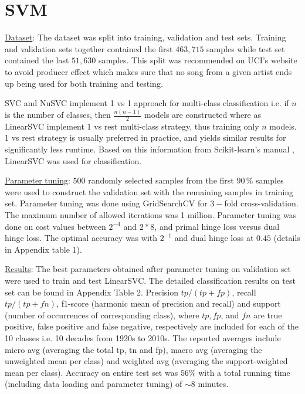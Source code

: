 \documentclass{article}
\begin{document}
\section*{SVM}
\underline{Dataset}: The dataset was split into training, validation and test sets. Training and validation sets together contained the first $463,715$ samples while test set contained the last $51,630$ samples. This split was recommended on UCI's website to avoid producer effect which makes sure that no song from a given artist ends up being used for both training and testing. 

\noindent SVC and NuSVC implement 1 vs 1 approach for multi-class classification i.e. if $n$ is the number of classes, then $\frac{n(n-1)}{2}$ models are constructed where as LinearSVC implement 1 vs rest multi-class strategy, thus training only $n$ models. 1 vs rest strategy is usually preferred in practice, and yields similar results for significantly less runtime. Based on this information from Scikit-learn's manual \cite{buitinck2013}, LinearSVC was used for classification. 

\noindent  \underline{Parameter tuning}: $500$ randomly selected samples from the first $90 \, \%$ samples were used to construct the validation set with the remaining samples in training set. Parameter tuning was done using GridSearchCV for $3-$fold cross-validation. The maximum number of allowed iterations was 1 million. Parameter tuning was done on cost values between $2^{-4}$ and $2*8$, and primal hinge loss versus dual hinge loss. The optimal accuracy was with $2^{-1}$ and dual hinge loss at $0.45$ (details in Appendix table 1). 

\noindent  \underline{Results}: The best parameters obtained after parameter tuning on validation set were used to train and test LinearSVC. The detailed classification results on test set can be found in Appendix Table 2. Precision $tp/(tp+fp)$, recall $tp/(tp+fn)$, f1-score (harmonic mean of precision and recall) and support (number of occurrences of corresponding class), where $tp, fp$, and $fn$ are true positive, false positive and false negative, respectively are included for each of the 10 classes i.e. 10 decades from 1920s to 2010s. The reported averages include micro avg (averaging the total tp, tn and fp), macro avg (averaging the unweighted mean per class) and weighted avg (averaging the support-weighted mean per class). Accuracy on entire test set was $56 \%$ with a total running time (including data loading and parameter tuning) of $\sim 8$ minutes. 
\end{document}

